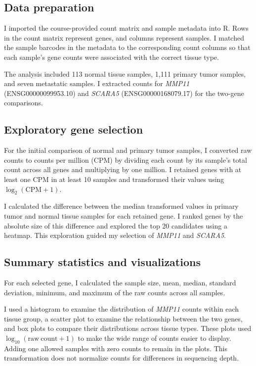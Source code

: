 \documentclass[11pt]{article}
\begin{document}
\subsection{Data preparation}

I imported the course-provided count matrix and sample
metadata into R. Rows in the count matrix represent genes,
and columns represent samples. I matched the sample
barcodes in the metadata to the corresponding count
columns so that each sample's gene counts were associated
with the correct tissue type.

The analysis included 113 normal tissue samples,
1,111 primary tumor samples, and seven metastatic samples.
I extracted counts for \textit{MMP11}
(ENSG00000099953.10) and \textit{SCARA5}
(ENSG00000168079.17) for the two-gene comparisons.

\subsection{Exploratory gene selection}

For the initial comparison of normal and primary tumor
samples, I converted raw counts to counts per million
(CPM) by dividing each count by its sample's total count
across all genes and multiplying by one million.
I retained genes with at least one CPM in at least
10 samples and transformed their values using
$\log_2(\mathrm{CPM}+1)$.

I calculated the difference between the median transformed
values in primary tumor and normal tissue samples for
each retained gene. I ranked genes by the absolute size
of this difference and explored the top 20 candidates
using a heatmap. This exploration guided my selection
of \textit{MMP11} and \textit{SCARA5}.

\subsection{Summary statistics and visualizations}

For each selected gene, I calculated the sample size,
mean, median, standard deviation, minimum, and maximum
of the raw counts across all samples.

I used a histogram to examine the distribution of
\textit{MMP11} counts within each tissue group, a scatter
plot to examine the relationship between the two genes,
and box plots to compare their distributions across
tissue types. These plots used
$\log_{10}(\mathrm{raw\ count}+1)$ to make the wide range
of counts easier to display. Adding one allowed samples
with zero counts to remain in the plots.
This transformation does not normalize counts for
differences in sequencing depth.
\end{document}
